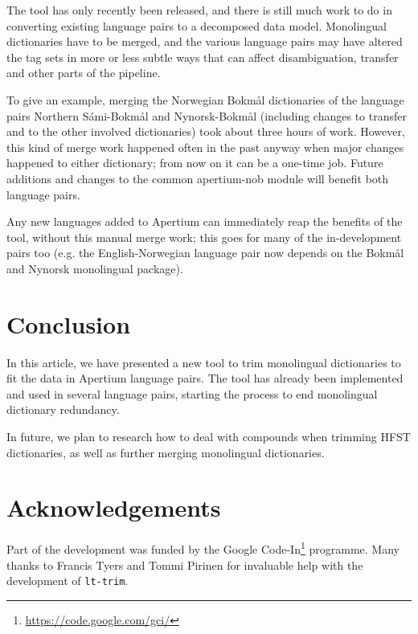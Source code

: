 \documentclass[10pt, a4paper]{article}
\newcommand{\tool}[1]{\texttt{#1}}
\begin{document}
The tool has only recently been released, and there is still much work
to do in converting existing language pairs to a decomposed data
model. Monolingual dictionaries have to be merged, and the various
language pairs may have altered the tag sets in more or less subtle
ways that can affect disambiguation, transfer and other parts of the
pipeline. 

To give an example, merging the Norwegian Bokmål dictionaries of the
language pairs Northern Sámi-Bokmål and Nynorsk-Bokmål (including
changes to transfer and to the other involved dictionaries) took about
three hours of work. However, this kind of merge work happened often
in the past anyway when major changes happened to either dictionary;
from now on it can be a one-time job. Future additions and changes to
the common apertium-nob module will benefit both language pairs.

Any new languages added to Apertium can immediately reap the benefits
of the tool, without this manual merge work; this goes for many of the
in-development pairs too (e.g. the English-Norwegian language pair now
depends on the Bokmål and Nynorsk monolingual package).

\section{Conclusion}

In this article, we have presented a new tool to trim monolingual
dictionaries to fit the data in Apertium language pairs. The tool has
already been implemented and used in several language pairs, starting
the process to end monolingual dictionary redundancy.

In future, we plan to research how to deal with compounds when
trimming HFST dictionaries, as well as further merging monolingual
dictionaries.

\section*{Acknowledgements}
Part of the development was funded by the Google
Code-In\footnote{\url{https://code.google.com/gci/}}
programme. Many thanks to Francis Tyers and Tommi Pirinen for
invaluable help with the development of \tool{lt-trim}.





\end{document}
